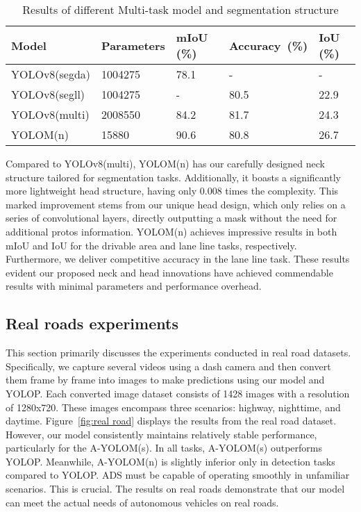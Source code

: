 \documentclass[lettersize,journal]{IEEEtran}
\begin{document}
\begin{table}[!h]
    \centering
    \caption{Results of different Multi-task model and segmentation structure}
    \label{tab:segmentation_comparison}
    \begin{tabularx}{\linewidth}{YYYYY}
    \toprule
    Model & Parameters & mIoU (\%) & \mbox{Accuracy (\%)} & IoU (\%) \\
    \midrule
    YOLOv8(segda) & 1004275 & 78.1 & - & - \\
    YOLOv8(segll) & 1004275 & - & 80.5 & 22.9 \\
    YOLOv8(multi) & 2008550 & 84.2 & 81.7 & 24.3 \\
    YOLOM(n) & 15880 & 90.6 & 80.8 & 26.7 \\
    \bottomrule
    \end{tabularx}
\end{table}

Compared to YOLOv8(multi), YOLOM(n) has our carefully designed neck structure tailored for segmentation tasks. Additionally, it boasts a significantly more lightweight head structure, having only 0.008 times the complexity. This marked improvement stems from our unique head design, which only relies on a series of convolutional layers, directly outputting a mask without the need for additional protos information. YOLOM(n) achieves impressive results in both mIoU and IoU for the drivable area and lane line tasks, respectively. Furthermore, we deliver competitive accuracy in the lane line task. These results evident our proposed neck and head innovations have achieved commendable results with minimal parameters and performance overhead.


\subsection{Real roads experiments}
\label{subsec: Real roads experiments}

This section primarily discusses the experiments conducted in real road datasets. Specifically, we capture several videos using a dash camera and then convert them frame by frame into images to make predictions using our model and YOLOP. Each converted image dataset consists of 1428 images with a resolution of 1280x720. These images encompass three scenarios: highway, nighttime, and daytime. Figure~\ref{fig:real road} displays the results from the real road dataset. However, our model consistently maintains relatively stable performance, particularly for the A-YOLOM(s). In all tasks, A-YOLOM(s) outperforms YOLOP. Meanwhile, A-YOLOM(n) is slightly inferior only in detection tasks compared to YOLOP. ADS must be capable of operating smoothly in unfamiliar scenarios. This is crucial. The results on real roads demonstrate that our model can meet the actual needs of autonomous vehicles on real roads.
\end{document}
